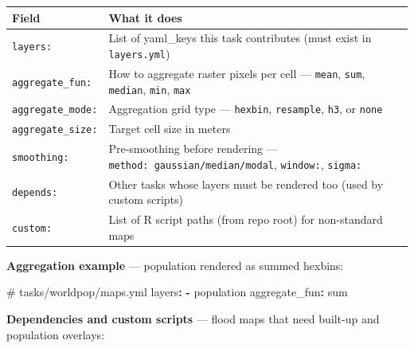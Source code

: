 \documentclass[
  letterpaper,
  DIV=11,
  numbers=noendperiod]{scrreprt}
\newenvironment{Shaded}{\begin{snugshade}}{\end{snugshade}}
\newcommand{\AttributeTok}[1]{\textcolor[rgb]{0.40,0.45,0.13}{#1}}
\newcommand{\CommentTok}[1]{\textcolor[rgb]{0.37,0.37,0.37}{#1}}
\newcommand{\FunctionTok}[1]{\textcolor[rgb]{0.28,0.35,0.67}{#1}}
\newcommand{\KeywordTok}[1]{\textcolor[rgb]{0.00,0.23,0.31}{\textbf{#1}}}
\newcounter{none} %
\begin{document}
{\def\LTcaptype{none} %
\begin{longtable}[]{@{}
  >{\raggedright\arraybackslash}p{}
  >{\raggedright\arraybackslash}p{}@{}}
\toprule\noalign{}
\begin{minipage}[b]{\linewidth}\raggedright
Field
\end{minipage} & \begin{minipage}[b]{\linewidth}\raggedright
What it does
\end{minipage} \\
\midrule\noalign{}
\endhead
\bottomrule\noalign{}
\endlastfoot
\texttt{layers:} & List of yaml\_keys this task contributes (must exist
in \texttt{layers.yml}) \\
\texttt{aggregate\_fun:} & How to aggregate raster pixels per cell ---
\texttt{mean}, \texttt{sum}, \texttt{median}, \texttt{min},
\texttt{max} \\
\texttt{aggregate\_mode:} & Aggregation grid type --- \texttt{hexbin},
\texttt{resample}, \texttt{h3}, or \texttt{none} \\
\texttt{aggregate\_size:} & Target cell size in meters \\
\texttt{smoothing:} & Pre-smoothing before rendering ---
\texttt{method:\ gaussian/median/modal}, \texttt{window:},
\texttt{sigma:} \\
\texttt{depends:} & Other tasks whose layers must be rendered too (used
by custom scripts) \\
\texttt{custom:} & List of R script paths (from repo root) for
non-standard maps \\
\end{longtable}
}

\textbf{Aggregation example} --- population rendered as summed hexbins:

\begin{Shaded}
\begin{Highlighting}[]
\CommentTok{\# tasks/worldpop/maps.yml}
\FunctionTok{layers}\KeywordTok{:}
\AttributeTok{  }\KeywordTok{{-}}\AttributeTok{ population}
\FunctionTok{aggregate\_fun}\KeywordTok{:}\AttributeTok{ sum}
\end{Highlighting}
\end{Shaded}

\textbf{Dependencies and custom scripts} --- flood maps that need
built-up and population overlays:
\end{document}
